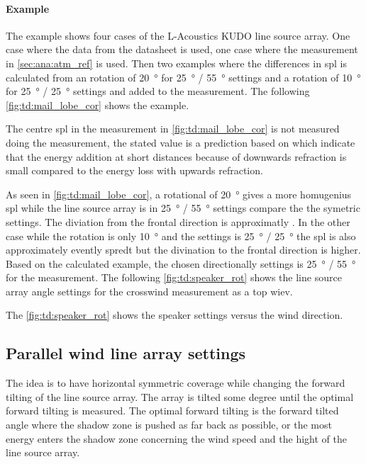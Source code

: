 \paragraph{Example} The example shows four cases of the L-Acoustics KUDO line source array. One case where the data from the datasheet is used, one case where the measurement in \autoref{sec:ana:atm_ref} is used. Then two examples where the differences in \gls{spl} is calculated from an rotation of \SI{20}{\degree} for \SI{25}{\degree} / \SI{55}{\degree} settings and a rotation of  \SI{10}{\degree} for \SI{25}{\degree} / \SI{25}{\degree} settings and added to the measurement. The following \autoref{fig:td:mail_lobe_cor} shows the example.



The centre \gls{spl} in the measurement in \autoref{fig:td:mail_lobe_cor} is not measured doing the measurement, the stated value is a prediction based on \citep{review_of_sound} which indicate that the energy addition at short distances because of downwards refraction is small compared to the energy loss with upwards refraction. 

As seen in \autoref{fig:td:mail_lobe_cor}, a rotational of \SI{20}{\degree} gives a more homugenius \gls{spl} while the line source array is in \SI{25}{\degree} / \SI{55}{\degree} settings compare the the symetric settings. The diviation from the frontal direction is approximatly . In the other case while the rotation is only \SI{10}{\degree} and the settings is \SI{25}{\degree} / \SI{25}{\degree} the \gls{spl} is also approximately evently spredt but the divination to the frontal direction is higher. Based on the calculated example, the chosen directionally settings is \SI{25}{\degree} / \SI{55}{\degree} for the measurement. The following \autoref{fig:td:speaker_rot} shows the line source array angle settings for the crosswind measurement as a top wiev. 


The \autoref{fig:td:speaker_rot} shows the speaker settings versus the wind direction.

\subsection{Parallel wind line array settings}\label{sub:des:par_set}
The idea is to have horizontal symmetric coverage while changing the forward tilting of the line source array. The array is tilted some degree until the optimal forward tilting is measured. The optimal forward tilting is the forward tilted angle where the shadow zone is pushed as far back as possible, or the most energy enters the shadow zone concerning the wind speed and the hight of the line source array. 



